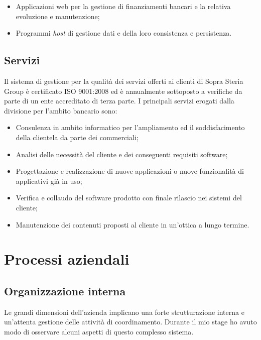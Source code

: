 	\begin{itemize}
		\item Applicazioni web per la gestione di finanziamenti bancari e la relativa evoluzione e manutenzione;
		\item Programmi \textit{host} di gestione dati e della loro consistenza e persistenza.
	\end{itemize}
	
	\subsection{Servizi}
	
	Il sistema di gestione per la qualità dei servizi offerti ai clienti di Sopra Steria Group è certificato ISO 9001:2008 ed è annualmente sottoposto a verifiche da parte di un ente accreditato di terza parte. I principali servizi erogati dalla divisione per l'ambito bancario sono:
	
	\begin{itemize}
		\item Consulenza in ambito informatico per l'ampliamento ed il soddisfacimento della clientela da parte dei commerciali;
		\item Analisi delle necessità del cliente e dei conseguenti requisiti software;
		\item Progettazione e realizzazione di nuove applicazioni o nuove funzionalità di applicativi già in uso;
		\item Verifica e collaudo del software prodotto con finale rilascio nei sistemi del cliente;
		\item Manutenzione dei contenuti proposti al cliente in un'ottica a lungo termine.
	\end{itemize}

\section{Processi aziendali}

	\subsection{Organizzazione interna}
	
	Le grandi dimensioni dell'azienda implicano una forte strutturazione interna e un'attenta gestione delle attività di coordinamento. Durante il mio stage ho avuto modo di osservare alcuni aspetti di questo complesso sistema.\\
	
